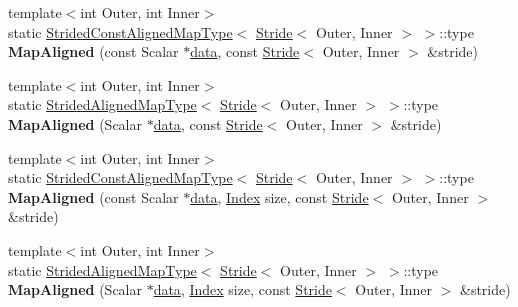 \begin{Indent}
\begin{DoxyCompactItemize}
{\footnotesize template$<$int Outer, int Inner$>$ }\\static \hyperlink{struct_eigen_1_1_plain_object_base_1_1_strided_const_aligned_map_type}{Strided\+Const\+Aligned\+Map\+Type}$<$ \hyperlink{group___core___module_class_eigen_1_1_stride}{Stride}$<$ Outer, Inner $>$ $>$\+::type {\bfseries Map\+Aligned} (const Scalar $\ast$\hyperlink{class_eigen_1_1_plain_object_base_ac25699535374b1854cf8494e44ad31b2}{data}, const \hyperlink{group___core___module_class_eigen_1_1_stride}{Stride}$<$ Outer, Inner $>$ \&stride)
\item 
\mbox{\label{class_eigen_1_1_plain_object_base_abd8ce90b470cfa30cae08f9c673912c9}} 
{\footnotesize template$<$int Outer, int Inner$>$ }\\static \hyperlink{struct_eigen_1_1_plain_object_base_1_1_strided_aligned_map_type}{Strided\+Aligned\+Map\+Type}$<$ \hyperlink{group___core___module_class_eigen_1_1_stride}{Stride}$<$ Outer, Inner $>$ $>$\+::type {\bfseries Map\+Aligned} (Scalar $\ast$\hyperlink{class_eigen_1_1_plain_object_base_ac25699535374b1854cf8494e44ad31b2}{data}, const \hyperlink{group___core___module_class_eigen_1_1_stride}{Stride}$<$ Outer, Inner $>$ \&stride)
\item 
\mbox{\label{class_eigen_1_1_plain_object_base_a91374e2e77a219a44d980cc14be3a961}} 
{\footnotesize template$<$int Outer, int Inner$>$ }\\static \hyperlink{struct_eigen_1_1_plain_object_base_1_1_strided_const_aligned_map_type}{Strided\+Const\+Aligned\+Map\+Type}$<$ \hyperlink{group___core___module_class_eigen_1_1_stride}{Stride}$<$ Outer, Inner $>$ $>$\+::type {\bfseries Map\+Aligned} (const Scalar $\ast$\hyperlink{class_eigen_1_1_plain_object_base_ac25699535374b1854cf8494e44ad31b2}{data}, \hyperlink{namespace_eigen_a62e77e0933482dafde8fe197d9a2cfde}{Index} size, const \hyperlink{group___core___module_class_eigen_1_1_stride}{Stride}$<$ Outer, Inner $>$ \&stride)
\item 
\mbox{\label{class_eigen_1_1_plain_object_base_a2b1ce06138d53af1bb729ec1dab87e5a}} 
{\footnotesize template$<$int Outer, int Inner$>$ }\\static \hyperlink{struct_eigen_1_1_plain_object_base_1_1_strided_aligned_map_type}{Strided\+Aligned\+Map\+Type}$<$ \hyperlink{group___core___module_class_eigen_1_1_stride}{Stride}$<$ Outer, Inner $>$ $>$\+::type {\bfseries Map\+Aligned} (Scalar $\ast$\hyperlink{class_eigen_1_1_plain_object_base_ac25699535374b1854cf8494e44ad31b2}{data}, \hyperlink{namespace_eigen_a62e77e0933482dafde8fe197d9a2cfde}{Index} size, const \hyperlink{group___core___module_class_eigen_1_1_stride}{Stride}$<$ Outer, Inner $>$ \&stride)

\end{DoxyCompactItemize}
\end{Indent}
